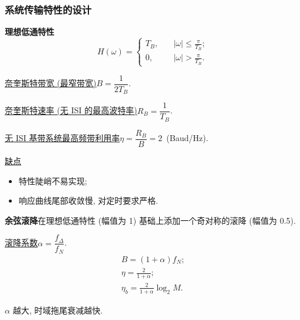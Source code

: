 \subsubsection{系统传输特性的设计}
\textbf{理想低通特性}
\begin{equation}
    H(\omega)=\begin{cases}
        T_B, & \quad |\omega|\leq\frac{\pi}{T_B}; \\
        0,   & \quad |\omega|>\frac{\pi}{T_B}.
    \end{cases}
\end{equation}

\underline{奈奎斯特带宽 (最窄带宽)}\quad $B=\dfrac{1}{2T_B}$.

\underline{奈奎斯特速率 (无 ISI 的最高波特率)}\quad $R_B=\dfrac{1}{T_B}$.

\underline{无 ISI 基带系统最高频带利用率}\quad $\eta=\dfrac{R_B}{B}=2$\ (Baud/Hz).

\underline{缺点}
\begin{itemize}
    \item 特性陡峭不易实现;
    \item 响应曲线尾部收敛慢, 对定时要求严格.
\end{itemize}

\textbf{余弦滚降}\quad 在理想低通特性 (幅值为 1) 基础上添加一个奇对称的滚降 (幅值为 0.5).

\underline{滚降系数}\quad $\alpha=\dfrac{f_\Delta}{f_N}$.
\begin{gather*}
    B=(1+\alpha)f_N; \\
    \eta=\frac{2}{1+\alpha}; \\
    \eta_b=\frac{2}{1+\alpha}\log_2M.
\end{gather*}

$\alpha$ 越大, 时域拖尾衰减越快.

